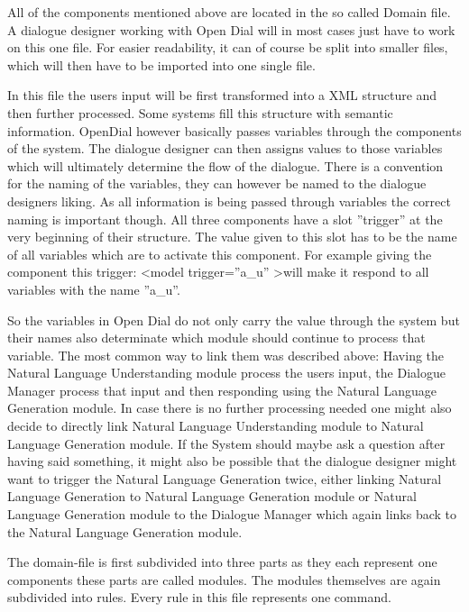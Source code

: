 All of the components mentioned above are located in the so called Domain file.
A dialogue designer working with Open Dial will in most cases just have to work on this one file. For easier readability, it can of course be split into smaller files, which will then have to be imported into one single file. \newline

In this file the users input will be first transformed into a XML structure and then further processed.
Some systems fill this structure with semantic information. 
OpenDial however basically passes variables through the components of the system. 
The dialogue designer can then assigns values to those variables which will ultimately determine the flow of the dialogue. 
There is a convention for the naming of the variables, they can however be named to the dialogue designers liking. 
As all information is being passed through variables the correct naming is important though. 
All three components have a slot ”trigger” at the very beginning of their structure. 
The value given to this slot has to be the name of all variables which are to activate this component.
For example giving the component this trigger: 
\textless model trigger=”a\_u” \textgreater will make it respond to all variables with the name ”a\_u”.  \newline

So the variables in Open Dial do not only carry the value through the system but their names also determinate which module should continue to process that variable. The most common way to link them was described above: Having the Natural Language Understanding module process the users input, the Dialogue Manager process that input and then responding using the Natural Language Generation module. 
In case there is no further processing needed one might also decide to directly link Natural Language Understanding module to Natural Language Generation module. 
If the System should maybe ask a question after having said something, it might also be possible that the dialogue designer might want to trigger the Natural Language Generation twice, either linking Natural Language Generation to Natural Language Generation module or Natural Language Generation module to the Dialogue Manager which again links back to the Natural Language Generation module. \newline

The domain-file is first subdivided into three parts as they each represent one components these parts are called modules. 
The modules themselves are again subdivided into rules. Every rule in this file represents one command. 

